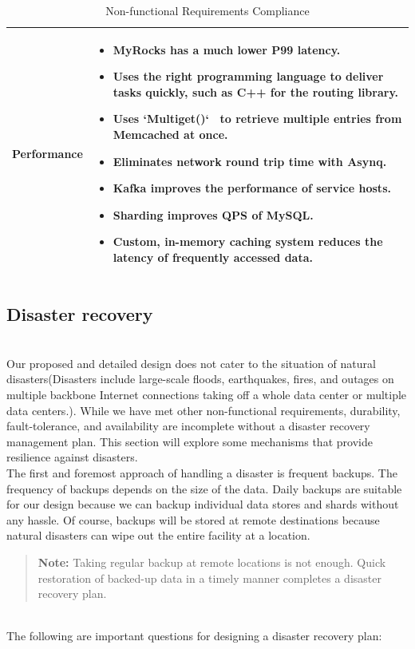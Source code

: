 \begin{table}[htbp]
{\begin{tabular}{|p{}|p{}|}
Performance & \begin{itemize} \tightlist \item MyRocks has a much lower P99 latency. \item Uses the right programming language to deliver tasks quickly, such as C++ for the routing library. \item Uses `Multiget()`~ to retrieve multiple entries from Memcached at once. \item Eliminates network round trip time with Asynq. \item Kafka improves the performance of service hosts. \item Sharding improves QPS of MySQL. \item Custom, in-memory caching system reduces the latency of frequently accessed data. \end{itemize} \\
\hline
\end{tabular}
}
\caption{Non-functional Requirements Compliance}
\end{table}

\subsection{Disaster recovery}\label{Jk--_uoRMbOA--Qczw9He}
\\
Our proposed and detailed design does not cater to the situation of natural disasters(Disasters include large-scale floods, earthquakes, fires, and outages on multiple backbone Internet connections taking off a whole data center or multiple data centers.). While we have met other non-functional requirements, durability, fault-tolerance, and availability are incomplete without a disaster recovery management plan. This section will explore some mechanisms that provide resilience against disasters.
\\
The first and foremost approach of handling a disaster is frequent backups. The frequency of backups depends on the size of the data. Daily backups are suitable for our design because we can backup individual data stores and shards without any hassle. Of course, backups will be stored at remote destinations because natural disasters can wipe out the entire facility at a location.
\begin{quote}
\textbf{Note:} Taking regular backup at remote locations is not enough. Quick restoration of backed-up data in a timely manner completes a disaster recovery plan.
\end{quote}
\\
The following are important questions for designing a disaster recovery plan:

